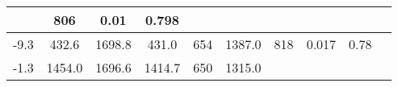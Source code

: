 \documentclass[a4paper,10pt]{article}
\begin{document}
\begin{longtable}{
     |
%    
    c|
%    
    c|
%    
    c|
%    
    c|
%    
    c|
%    
    c|
%    
    c|
%    
    c|
%    
    c|
%    
    c|
%    
    }
%        
        & 806
%        

%        

%        
        & 0.01
%        

%        

%        
        & 0.798
%        

%        
        \\
        \hline

        

%        

%        
        -9.3
%        

%        

%        
        & 432.6
%        

%        

%        
        & 1698.8
%        

%        

%        
        & 431.0
%        

%        

%        
        & 654
%        

%        

%        
        & 1387.0
%        

%        

%        
        & 818
%        

%        

%        
        & 0.017
%        

%        

%        
        & 0.78
%        

%        
        \\
        \hline

        

%        

%        
        -1.3
%        

%        

%        
        & 1454.0
%        

%        

%        
        & 1696.6
%        

%        

%        
        & 1414.7
%        

%        

%        
        & 650
%        

%        

%        
        & 1315.0
%        

%        


\end{longtable}
\end{document}
